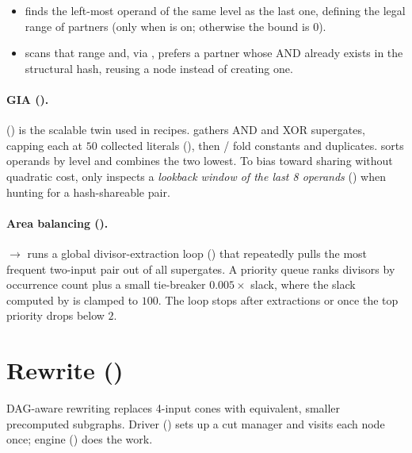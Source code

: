 \begin{itemize}
\item {} finds the left-most operand of the same level
as the last one, defining the legal range of partners (only when
 is on; otherwise the bound is $0$).
\item {} scans that range and, via
, prefers a partner whose AND already exists in the
structural hash, reusing a node instead of creating one.
\end{itemize}

\paragraph{GIA ().}
 () is the scalable twin used in
\cmd{\&} recipes.  gathers AND and XOR supergates,
capping each at $50$ collected literals (), then
/ fold constants and duplicates.
 sorts operands by level and combines the two lowest.
To bias toward sharing without quadratic cost,  only
inspects a \emph{lookback window of the last 8 operands}
() when hunting for a hash-shareable pair.

\paragraph{Area balancing ().}
 $\rightarrow$  runs a global
divisor-extraction loop () that repeatedly pulls the most frequent
two-input pair out of all supergates. A priority queue ranks divisors by
occurrence count plus a small tie-breaker $0.005 \times$ slack, where the slack
computed by  is clamped to $100$. The loop stops after
 extractions or once the top priority drops below $2$.

\section{Rewrite (\texorpdfstring{}{rewrite})}
\label{sec:opt-rewrite}

DAG-aware rewriting replaces 4-input cones with equivalent, smaller precomputed
subgraphs. Driver  () sets up
a cut manager and visits each node once; engine 
() does the work.

